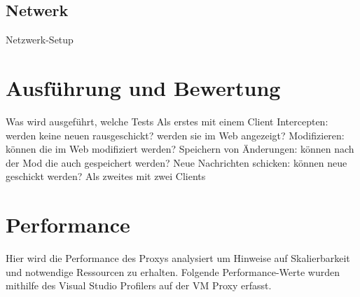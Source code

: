     \subsection{Netwerk}
    Netzwerk-Setup
    
\section{Ausführung und Bewertung}
Was wird ausgeführt, welche Tests
Als erstes mit einem Client
    Intercepten: werden keine neuen rausgeschickt? werden sie im Web angezeigt?
    Modifizieren: können die im Web modifiziert werden?
    Speichern von Änderungen: können nach der Mod die auch gespeichert werden?
    Neue Nachrichten schicken: können neue geschickt werden?
Als zweites mit zwei Clients

\section{Performance}
    Hier wird die Performance des Proxys analysiert um Hinweise auf Skalierbarkeit und notwendige Ressourcen zu erhalten.
    Folgende Performance-Werte wurden mithilfe des Visual Studio Profilers auf der \ac{VM} Proxy erfasst.
    
